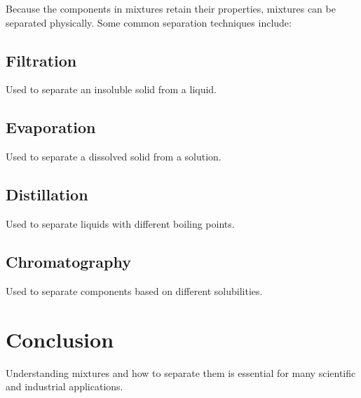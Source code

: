 \documentclass{article}
\begin{document}
Because the components in mixtures retain their properties, mixtures can be separated physically. Some common separation techniques include:

\subsection{Filtration}
Used to separate an insoluble solid from a liquid.

\subsection{Evaporation}
Used to separate a dissolved solid from a solution.

\subsection{Distillation}
Used to separate liquids with different boiling points.

\subsection{Chromatography}
Used to separate components based on different solubilities.

\section{Conclusion}

Understanding mixtures and how to separate them is essential for many scientific and industrial applications.
\end{document}
